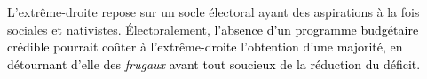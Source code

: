 \documentclass[12pt,french]{article}
\newcommand{\blue}[1]{\textcolor{black}{#1}} %
\begin{document}
L'extrême-droite repose sur un socle électoral ayant des aspirations à la fois sociales et nativistes. Électoralement, \blue{l'absence d'un %
programme budgétaire crédible %
pourrait coûter à l'extrême-droite l'obtention d'une majorité, en détournant d'elle des %
\textit{frugaux} avant tout soucieux de la réduction du déficit}. %
\end{document}
